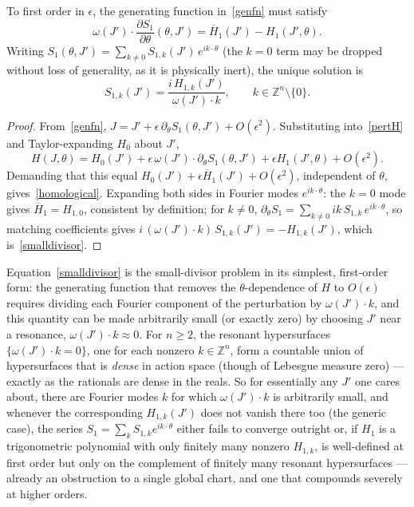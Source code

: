 \begin{proposition}
To first order in $\epsilon$, the generating function in~\eqref{genfn} must
    satisfy
\begin{equation}
\omega(J')\cdot\frac{\partial S_1}{\partial\theta}(\theta,J')
    =\overline H_1(J')-H_1(J',\theta) .
\label{homological}
\end{equation}
Writing $S_1(\theta,J')=\sum_{k\neq0}S_{1,k}(J')\,e^{ik\cdot\theta}$ (the $k=0$
    term may be dropped without loss of generality, as it is physically inert),
    the unique solution is
\begin{equation}
S_{1,k}(J')=\frac{i\,H_{1,k}(J')}{\omega(J')\cdot k},\qquad k\in\mathbb Z^n\setminus\{0\}.
\label{smalldivisor}
\end{equation}
\end{proposition}

\begin{proof}
From~\eqref{genfn}, $J=J'+\epsilon\,\partial_\theta
    S_1(\theta,J')+O(\epsilon^2)$. Substituting into~\eqref{pertH} and
    Taylor-expanding $H_0$ about $J'$,
\[
H(J,\theta)=H_0(J')+\epsilon\,\omega(J')\cdot\partial_\theta S_1(\theta,J')+\epsilon H_1(J',\theta)+O(\epsilon^2).
\]
Demanding that this equal $H_0(J')+\epsilon\overline H_1(J')+O(\epsilon^2)$,
    independent of $\theta$, gives~\eqref{homological}. Expanding both sides in
    Fourier modes $e^{ik\cdot\theta}$: the $k=0$ mode gives $\overline
    H_1=H_{1,0}$, consistent by definition; for $k\neq0$, $\partial_\theta
    S_1=\sum_{k\neq0}ik\,S_{1,k}\,e^{ik\cdot\theta}$, so matching coefficients
    gives $i\,(\omega(J')\cdot k)\,S_{1,k}(J')=-H_{1,k}(J')$, which
    is~\eqref{smalldivisor}.
\end{proof}

Equation~\eqref{smalldivisor} is the small-divisor problem in its simplest,
first-order form: the generating function that removes the $\theta$-dependence
of $H$ to $O(\epsilon)$ requires dividing each Fourier component of the
perturbation by $\omega(J')\cdot k$, and this quantity can be made arbitrarily
small (or exactly zero) by choosing $J'$ near a resonance, $\omega(J')\cdot
k\approx0$. For $n\ge2$, the resonant hypersurfaces $\{\omega(J')\cdot k=0\}$,
one for each nonzero $k\in\mathbb Z^n$, form a countable union of hypersurfaces
that is \emph{dense} in action space (though of Lebesgue measure zero) ---
exactly as the rationals are dense in the reals. So for essentially any $J'$
one cares about, there are Fourier modes $k$ for which $\omega(J')\cdot k$ is
arbitrarily small, and whenever the corresponding $H_{1,k}(J')$ does not vanish
there too (the generic case), the series $S_1=\sum_k S_{1,k}e^{ik\cdot\theta}$
either fails to converge outright or, if $H_1$ is a trigonometric polynomial
with only finitely many nonzero $H_{1,k}$, is well-defined at first order but
only on the complement of finitely many resonant hypersurfaces --- already an
obstruction to a single global chart, and one that compounds severely at higher
orders.

